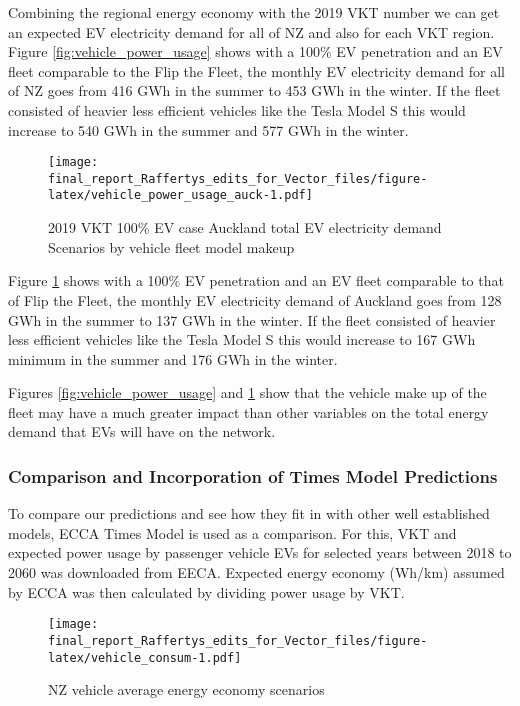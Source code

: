 \documentclass[
]{article}
\begin{document}
Combining the regional energy economy with the 2019 VKT number we can
get an expected EV electricity demand for all of NZ and also for each
VKT region. Figure \ref{fig:vehicle_power_usage} shows with a 100\% EV
penetration and an EV fleet comparable to the Flip the Fleet, the
monthly EV electricity demand for all of NZ goes from 416 GWh in the
summer to 453 GWh in the winter. If the fleet consisted of heavier less
efficient vehicles like the Tesla Model S this would increase to 540 GWh
in the summer and 577 GWh in the winter.

\begin{figure}
\centering
\texttt{[image: final\_report\_Raffertys\_edits\_for\_Vector\_files/figure-latex/vehicle\_power\_usage\_auck-1.pdf]}
\caption{2019 VKT 100\% EV case Auckland total EV electricity demand
Scenarios by vehicle fleet model
makeup\label{fig:vehicle_power_usage_auck}}
\end{figure}

Figure \ref{fig:vehicle_power_usage_auck} shows with a 100\% EV
penetration and an EV fleet comparable to that of Flip the Fleet, the
monthly EV electricity demand of Auckland goes from 128 GWh in the
summer to 137 GWh in the winter. If the fleet consisted of heavier less
efficient vehicles like the Tesla Model S this would increase to 167 GWh
minimum in the summer and 176 GWh in the winter.

Figures \ref{fig:vehicle_power_usage} and
\ref{fig:vehicle_power_usage_auck} show that the vehicle make up of the
fleet may have a much greater impact than other variables on the total
energy demand that EVs will have on the network.

\hypertarget{comparison-and-incorporation-of-times-model-predictions}{%
\subsubsection{Comparison and Incorporation of Times Model
Predictions}\label{comparison-and-incorporation-of-times-model-predictions}}

To compare our predictions and see how they fit in with other well
established models, ECCA Times Model \cite{times_model} is used as a
comparison. For this, VKT and expected power usage by passenger vehicle
EVs for selected years between 2018 to 2060 was downloaded from EECA.
Expected energy economy (Wh/km) assumed by ECCA was then calculated by
dividing power usage by VKT.

\begin{figure}
\centering
\texttt{[image: final\_report\_Raffertys\_edits\_for\_Vector\_files/figure-latex/vehicle\_consum-1.pdf]}
\caption{NZ vehicle average energy economy
scenarios\label{fig:vehicle_consum}}
\end{figure}
\end{document}
